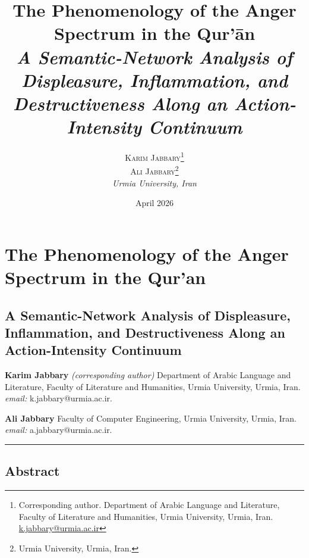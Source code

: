 \documentclass[11pt,a4paper]{article}
\title{\Large\bfseries The Phenomenology of the Anger Spectrum in the Qur'\=an\\[0.4em]
  \normalsize\textit{A Semantic-Network Analysis of Displeasure, Inflammation, and Destructiveness Along an Action-Intensity Continuum}}
\author{
  \textsc{Karim Jabbary}\thanks{Corresponding author. Department of Arabic Language and Literature, Faculty of Literature and Humanities, Urmia University, Urmia, Iran. \href{mailto:k.jabbary@urmia.ac.ir}{k.jabbary@urmia.ac.ir}}\\
  \textsc{Ali Jabbary}\thanks{Urmia University, Urmia, Iran.}\\[0.6em]
  \small\textit{Urmia University, Iran}
}
\date{April 2026}
\begin{document}
\maketitle

\section{The Phenomenology of the Anger Spectrum in the
Qur'an}\label{the-phenomenology-of-the-anger-spectrum-in-the-quran}

\subsection{A Semantic-Network Analysis of Displeasure, Inflammation,
and Destructiveness Along an Action-Intensity
Continuum}\label{a-semantic-network-analysis-of-displeasure-inflammation-and-destructiveness-along-an-action-intensity-continuum}

\textbf{Karim Jabbary} \emph{(corresponding author)} Department of
Arabic Language and Literature, Faculty of Literature and Humanities,
Urmia University, Urmia, Iran. \emph{email:} k.jabbary@urmia.ac.ir.

\textbf{Ali Jabbary} Faculty of Computer Engineering, Urmia University,
Urmia, Iran. \emph{email:} a.jabbary@urmia.ac.ir.

\begin{center}\rule{0.5\linewidth}{0.5pt}\end{center}

\subsection{Abstract}\label{abstract}
\end{document}

